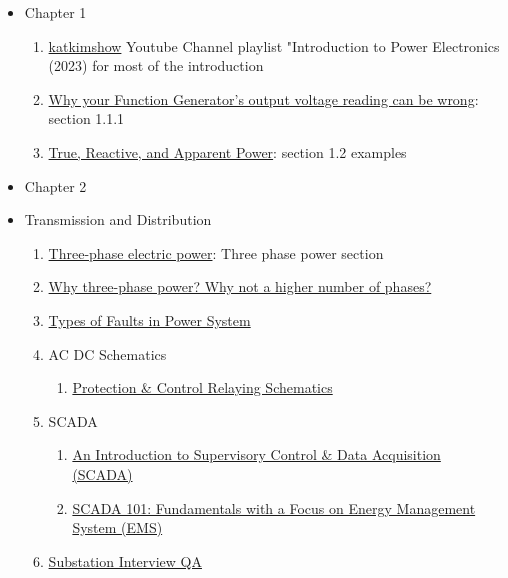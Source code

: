 \begin{itemize}
    \item Chapter 1
    \begin{enumerate}
        \item \href{https://www.youtube.com/watch?v=hRAyfJLZnC0&list=PLmK1EnKxphinxBub5hL0ZoJXWoqjkGE19}{katkimshow} Youtube Channel playlist "Introduction to Power Electronics (2023) for most of the introduction
        \item \href{https://www.youtube.com/watch?v=tClE8s6RZdg}{Why your Function Generator's output voltage reading can be wrong}: section 1.1.1
        \item \href{https://www.allaboutcircuits.com/textbook/alternating-current/chpt-11/true-reactive-and-apparent-power/}{True, Reactive, and Apparent Power}: section 1.2 examples
    \end{enumerate}

    \item Chapter 2
    
    \item Transmission and Distribution
    \begin{enumerate}
        \item \href{https://en.wikipedia.org/wiki/Three-phase_electric_power}{Three-phase electric power}: Three phase power section
        \item \href{https://electronics.stackexchange.com/questions/185308/why-three-phase-power-why-not-a-higher-number-of-phases}{Why three-phase power? Why not a higher number of phases?}
        \item \href{https://circuitglobe.com/types-of-faults-in-power-system.html}{Types of Faults in Power System}
        \item AC DC Schematics
        \begin{enumerate}
            \item \href{https://electrical-engineering-portal.com/ac-dc-schematics-protection-control-relaying}{Protection \& Control Relaying Schematics}
        \end{enumerate}
        \item SCADA 
        \begin{enumerate}
            \item \href{https://www.solisplc.com/scada}{An Introduction to Supervisory Control \& Data Acquisition (SCADA)}
            \item \href{https://www.euci.com/event_post/scada-fundamentals-energy-management-system/}{SCADA 101: Fundamentals with a Focus on Energy Management System (EMS)}
        \end{enumerate}
        \item \href{https://www.eeeguide.com/substations-interview-questions-and-answers/}{Substation Interview QA}
    \end{enumerate}
\end{itemize}